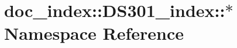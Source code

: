 \hypertarget{namespacedoc__index_1_1DS301__index_1_1_5}{
\section{doc\_\-index::DS301\_\-index::$\ast$ Namespace Reference}
\label{namespacedoc__index_1_1DS301__index_1_1_5}
}



